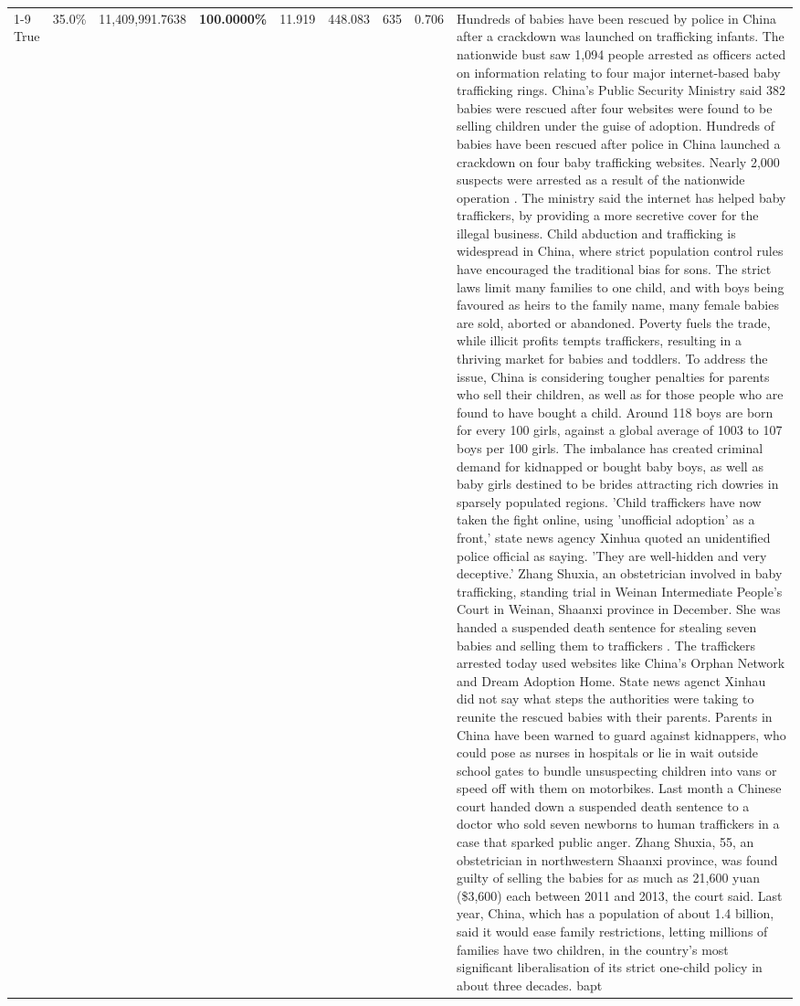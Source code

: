 \begin{table}[H]
\begin{tabular}{lllrlllll}
\cline{1-9}
True & 35.0\% & 11,409,991.7638 & \bfseries \color{red} 100.0000\% & 11.919 & 448.083 & 635 & 0.706 & Hundreds of babies have been rescued by police in China after a crackdown was launched on trafficking infants. The nationwide bust saw 1,094 people arrested as officers acted on information relating to four major internet-based baby trafficking rings. China's Public Security Ministry said 382 babies were rescued after four websites were found to be selling children under the guise of adoption. Hundreds of babies have been rescued after police in China launched a crackdown on four baby trafficking websites. Nearly 2,000 suspects were arrested as a result of the nationwide operation . The ministry said the internet has helped baby traffickers, by providing a more secretive cover for the illegal business. Child abduction and trafficking is widespread in China, where strict population control rules have encouraged the traditional bias for sons. The strict laws limit many families to one child, and with boys being favoured as heirs to the family name, many female babies are sold, aborted or abandoned. Poverty fuels the trade, while illicit profits tempts traffickers, resulting in a thriving market for babies and toddlers. To address the issue, China is considering tougher penalties for parents who sell their children, as well as for those people who are found to have bought a child. Around 118 boys are born for every 100 girls, against a global average of 1003 to 107 boys per 100 girls. The imbalance has created criminal demand for kidnapped or bought baby boys, as well as baby girls destined to be brides attracting rich dowries in sparsely populated regions. 'Child traffickers have now taken the fight online, using 'unofficial adoption' as a front,' state news agency Xinhua quoted an unidentified police official as saying. 'They are well-hidden and very deceptive.' Zhang Shuxia, an obstetrician involved in baby trafficking, standing trial in Weinan Intermediate People's Court in Weinan, Shaanxi province in December. She was handed a suspended death sentence for stealing seven babies and selling them to traffickers . The traffickers arrested today used websites like China's Orphan Network and Dream Adoption Home. State news agenct Xinhau did not say what steps the authorities were taking to reunite the rescued babies with their parents. Parents in China have been warned to guard against kidnappers, who could pose as nurses in hospitals or lie in wait outside school gates to bundle unsuspecting children into vans or speed off with them on motorbikes. Last month a Chinese court handed down a suspended death sentence to a doctor who sold seven newborns to human traffickers in a case that sparked public anger. Zhang Shuxia, 55, an obstetrician in northwestern Shaanxi province, was found guilty of selling the babies for as much as 21,600 yuan (\$3,600) each between 2011 and 2013, the court said. Last year, China, which has a population of about 1.4 billion, said it would ease family restrictions, letting millions of families have two children, in the country's most significant liberalisation of its strict one-child policy in about three decades. bapt \\

\end{tabular}
\end{table}
